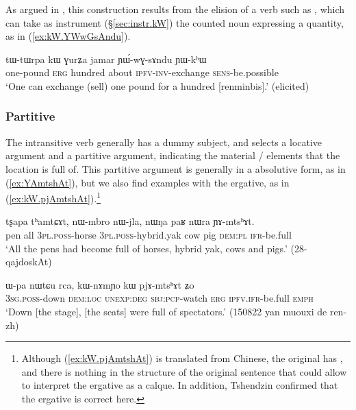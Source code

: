 As argued in \citet[23]{jacques16comparative}, this construction results from the elision of a verb such as , which can take as instrument (§\ref{sec:instr.kW}) the counted noun expressing a quantity, as in (\ref{ex:kW.YWwGsAndu}).


\begin{exe}
\ex \label{ex:kW.YWwGsAndu}
\gll tɯ-tɯrpa kɯ ɣurʑa jamar ɲɯ́-wɣ-sɤndu ɲɯ-kʰɯ \\
one-pound \textsc{erg} hundred about \textsc{ipfv}-\textsc{inv}-exchange \textsc{sens}-be.possible \\
\glt `One can exchange (sell) one pound for a hundred [renminbis].' (elicited)
\end{exe}

\subsubsection{Partitive} \label{sec:kW.mtshAt}
 
The intransitive verb  generally has a dummy subject, and selects a locative argument and a partitive argument, indicating the material / elements that the location is full of. This partitive argument is generally in a absolutive form, as in (\ref{ex:YAmtshAt}), but we also find examples with the ergative, as in (\ref{ex:kW.pjAmtshAt}).\footnote{Although (\ref{ex:kW.pjAmtshAt}) is translated from Chinese, the original has , and there is nothing in the structure of the original sentence that could allow to interpret the ergative as a calque. In addition, Tshendzin confirmed that the ergative is correct here. }

\begin{exe}
\ex \label{ex:YAmtshAt}
\gll tʂapa tʰamtɕɤt, nɯ-mbro nɯ-jla, nɯŋa paʁ nɯra ɲɤ-mtsʰɤt. \\
pen all \textsc{3pl}.\textsc{poss}-horse \textsc{3pl}.\textsc{poss}-hybrid.yak cow pig \textsc{dem}:\textsc{pl} \textsc{ifr}-be.full \\
\glt `All the pens had become full of horses, hybrid yak, cows and pigs.' (28-qajdoskAt)
\end{exe}


\begin{exe}
\ex \label{ex:kW.pjAmtshAt}
\gll  ɯ-pa nɯtɕu rca, kɯ-nɤmɲo kɯ pjɤ-mtsʰɤt ʑo \\
\textsc{3sg}.\textsc{poss}-down \textsc{dem}:\textsc{loc} \textsc{unexp}:\textsc{deg} \textsc{sbj}:\textsc{pcp}-watch \textsc{erg} \textsc{ipfv}.\textsc{ifr}-be.full \textsc{emph} \\
\glt `Down [the stage], [the seats] were full of spectators.' (150822 yan muouxi de ren-zh)
\end{exe}

